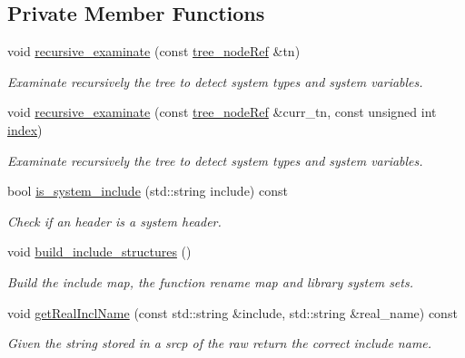 \subsection*{Private Member Functions}
\begin{DoxyCompactItemize}
\item 
void \hyperlink{classCheckSystemType_a63d20b2fc15355131c5860037581b037}{recursive\+\_\+examinate} (const \hyperlink{tree__node_8hpp_a6ee377554d1c4871ad66a337eaa67fd5}{tree\+\_\+node\+Ref} \&tn)
\begin{DoxyCompactList}\small\item\em Examinate recursively the tree to detect system types and system variables. \end{DoxyCompactList}\item 
void \hyperlink{classCheckSystemType_abf10add839bdbde290f74ecd7561392a}{recursive\+\_\+examinate} (const \hyperlink{tree__node_8hpp_a6ee377554d1c4871ad66a337eaa67fd5}{tree\+\_\+node\+Ref} \&curr\+\_\+tn, const unsigned int \hyperlink{tutorial__pact__2019_2Introduction_2third_2include_2Keccak_8h_a028c9bdc8344cca38ab522a337074797}{index})
\begin{DoxyCompactList}\small\item\em Examinate recursively the tree to detect system types and system variables. \end{DoxyCompactList}\item 
bool \hyperlink{classCheckSystemType_aecaee42bfbe41b7524b51fee2e94f5e8}{is\+\_\+system\+\_\+include} (std\+::string include) const
\begin{DoxyCompactList}\small\item\em Check if an header is a system header. \end{DoxyCompactList}\item 
void \hyperlink{classCheckSystemType_aec96886624b0bbe586f38f8bcf7cdca0}{build\+\_\+include\+\_\+structures} ()
\begin{DoxyCompactList}\small\item\em Build the include map, the function rename map and library system sets. \end{DoxyCompactList}\item 
void \hyperlink{classCheckSystemType_a8797397119d638dd0002102672096343}{get\+Real\+Incl\+Name} (const std\+::string \&include, std\+::string \&real\+\_\+name) const
\begin{DoxyCompactList}\small\item\em Given the string stored in a srcp of the raw return the correct include name. \end{DoxyCompactList}\item 

\end{DoxyCompactItemize}
